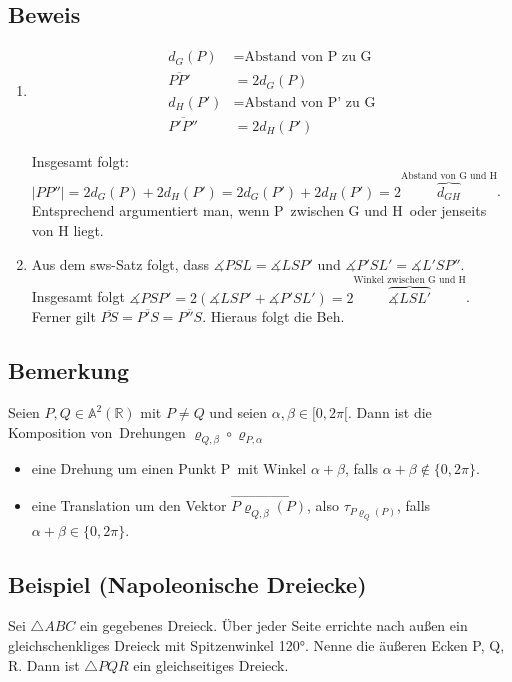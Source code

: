 \subsection{Beweis}
\begin{enumerate}
	\item {}
	\begin{align*}
		d_G(P) &= \text{Abstand von P zu G} \\
		\overline{PP'} &= 2 d_G(P) \\
		d_H(P') &= \text{Abstand von P' zu G} \\
		\overline{P'P''} &= 2 d_H(P')
	\end{align*}

	Insgesamt folgt: $|PP''| = 2 d_G(P) + 2 d_H(P') = 2 d_G(P') + 2 d_H(P') = 2 \overbrace{d_{GH}}^{\text{Abstand von G und H}}$.
	Entsprechend argumentiert man, wenn P zwischen G und H oder jenseits von H liegt.

	\item {}
	Aus dem sws-Satz folgt, dass $\measuredangle PSL = \measuredangle LSP'$ und $\measuredangle P'SL' = \measuredangle L'SP''$.
	Insgesamt folgt $\measuredangle PSP' = 2 (\measuredangle LSP' + \measuredangle P'SL') = 2 \overbrace{\measuredangle LSL'}^{\text{Winkel zwischen G und H}}$.
	Ferner gilt $\overline{PS} = \overline{P'S} = \overline{P''S}$. Hieraus folgt die Beh. %
\end{enumerate}

\subsection{Bemerkung}
Seien $P, Q \in \mathbb{A}^2(\mathbb{R})$ mit $P \neq Q$ und seien $\alpha, \beta \in [0, 2 \pi[$.
Dann ist die Komposition von Drehungen $\varrho_{Q, \beta} \circ \varrho_{P, \alpha}$
\begin{itemize}
	\item eine Drehung um einen Punkt P mit Winkel $\alpha + \beta$, falls $\alpha + \beta \notin \{0, 2 \pi\}$.
	\item eine Translation  um den Vektor $\overrightarrow{P \varrho_{Q, \beta}(P)}$, also $\tau_{P \varrho_{Q}(P)}$, falls $\alpha + \beta \in \{0, 2 \pi\}$.
\end{itemize}

\subsection{Beispiel (Napoleonische Dreiecke)}
Sei $\triangle ABC$ ein gegebenes Dreieck. Über jeder Seite errichte nach außen ein gleichschenkliges Dreieck mit Spitzenwinkel 120°. 
Nenne die äußeren Ecken P, Q, R. Dann ist $\triangle PQR$ ein gleichseitiges Dreieck.

